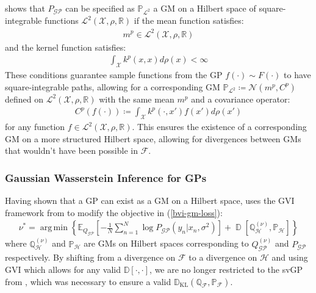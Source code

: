\documentclass{article}
\newcommand{\KLD}{\operatorname{\mathbb{D}_{KL}}}
\newcommand{\D}{\operatorname{\mathbb{D}}}
\newcommand{\GP}{\operatorname{\mathcal{GP}}}
\DeclareMathOperator*{\argmin}{arg\,min}
\numberwithin{equation}{section}
\begin{document}
\cite{wild2022generalized} shows that $P_{\GP}$ can be specified as $\mathbb{P}_{\mathcal{L}^2}$ a GM on a Hilbert space of square-integrable functions $\mathcal{L}^2(\mathcal{X}, \rho, \mathbb{R})$ if the mean function satisfies:
\begin{align}
    \label{smooth-mean-function-condition}
    m^p \in \mathcal{L}^2(\mathcal{X}, \rho, \mathbb{R})
\end{align}
and the kernel function satisfies:
\begin{align}
    \int_{\mathcal{X}} k^p(x, x) d\rho(x) < \infty
    \label{trace-kernel-condition}
\end{align}
These conditions guarantee sample functions from the GP $f(\cdot) \sim F(\cdot)$ to have square-integrable paths, allowing for a corresponding GM $\mathbb{P}_{\mathcal{L}^2} \coloneqq \mathcal{N}(m^p, C^p)$ defined on $\mathcal{L}^2(\mathcal{X}, \rho, \mathbb{R})$ with the same mean $m^p$ and a covariance operator:
\begin{align}
    C^p(f(\cdot)) \coloneqq \int_{\mathcal{X}} k^p(\cdot, x')f(x')d \rho(x')
    \label{gm-covariance-operator}
\end{align}
for any function $f \in \mathcal{L}^2(\mathcal{X}, \rho, \mathbb{R})$. This ensures the existence of a corresponding GM on a more structured Hilbert space, allowing for divergences between GMs that wouldn't have been possible in $\mathcal{F}$. 

\subsubsection{Gaussian Wasserstein Inference for GPs}
Having shown that a GP can exist as a GM on a Hilbert space, \cite{wild2022generalized} uses the GVI framework from \cite{knoblauch2022optimization} to modify the objective in (\ref{bvi-gm-loss}):
\begin{align}
    \label{gwi-objective}
    \nu^* = \argmin\left\{ \mathbb{E}_{Q_{\GP}}\left[- \frac{1}{N}\sum_{n=1}^N \log P_{\GP}\left(y_n \vert x_n, \sigma^2\right) \right] + \D \left[\mathbb{Q}^{(\nu)}_{\mathcal{H}}, \mathbb{P}_{\mathcal{H}} \right]\right\}
\end{align}
where $\mathbb{Q}^{(\nu)}_{\mathcal{H}}$ and $\mathbb{P}_{\mathcal{H}}$ are GMs on Hilbert spaces corresponding to $Q^{(\nu)}_{\GP}$ and $P_{\GP}$ respectively. By shifting from a divergence on $\mathcal{F}$ to a divergence on $\mathcal{H}$ and using GVI which allows for any valid $\mathbb{D}[\cdot, \cdot]$, we are no longer restricted to the svGP from \cite{titsias2009variational}, which was necessary to ensure a valid $\KLD(\mathbb{Q}_{\mathcal{F}},  \mathbb{P}_{\mathcal{F}})$. 
\end{document}
